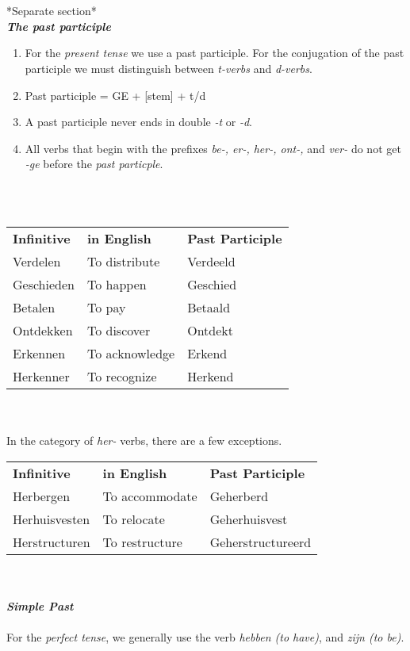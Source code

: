 \documentclass[letterpaper,11pt]{article}
\begin{document}
\\ \\
*Separate section* \\
\textbf{\textit{The past participle}}
\begin{enumerate}
    \item For the \textit{present tense} we use a past participle. For the
        conjugation of the past participle we must distinguish between
        \textit{t-verbs} and \textit{d-verbs}.
    \item Past participle = GE + [stem] + t/d %
    \item A past participle never ends in double \textit{-t} or \textit{-d}.
    \item All verbs that begin with the prefixes \textit{be-, er-, her-, ont-,}
        and \textit{ver-} do not get \textit{-ge} before the \textit{past
        particple}.
\end{enumerate}
\\ \\
\begin{tabular}[t]{l l l}
    \textbf{Infinitive} & \textbf{in English} & \textbf{Past Participle} \\
    Verdelen & To distribute & Verdeeld \\
    Geschieden & To happen & Geschied \\
    Betalen & To pay & Betaald \\
    Ontdekken & To discover & Ontdekt \\
    Erkennen & To acknowledge & Erkend \\
    Herkenner & To recognize & Herkend \\
\end{tabular}
\\ \\
In the category of \textit{her-} verbs, there are a few exceptions.
\begin{tabular}[t]{l l l}
    \textbf{Infinitive} & \textbf{in English} & \textbf{Past Participle} \\
    Herbergen & To accommodate & Geherberd \\
    Herhuisvesten & To relocate & Geherhuisvest \\
    Herstructuren & To restructure & Geherstructureerd \\
\end{tabular}
\\ \\ 
\textbf{\textit{Simple Past}}
\\ \\ 
For the \textit{perfect tense}, we generally use the verb \textit{hebben (to
have)}, and \textit{zijn (to be)}.
\end{document}
